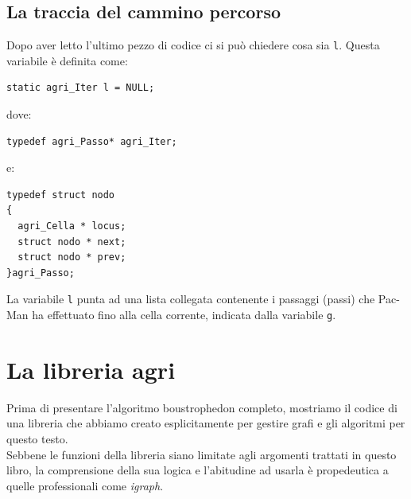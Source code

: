 \documentclass[8pt]{book}
\begin{document}
\subsection{La traccia del cammino percorso}

Dopo aver letto l'ultimo pezzo di codice ci si può chiedere cosa sia \texttt{l}. Questa variabile è definita come:

  \begin{spacing}{0.9}
    \begin{small}
      \begin{tcolorbox}
\begin{verbatim}
static agri_Iter l = NULL;
\end{verbatim}
    \end{tcolorbox}
  \end{small}
\end{spacing}

dove:

  \begin{spacing}{0.9}
    \begin{small}
      \begin{tcolorbox}
\begin{verbatim}
typedef agri_Passo* agri_Iter; 
\end{verbatim}
    \end{tcolorbox}
  \end{small}
\end{spacing}

e:

  \begin{spacing}{0.9}
    \begin{small}
      \begin{tcolorbox}
\begin{verbatim}
typedef struct nodo
{
  agri_Cella * locus;
  struct nodo * next;
  struct nodo * prev;
}agri_Passo;  
\end{verbatim}
    \end{tcolorbox}
  \end{small}
\end{spacing}


La variabile \texttt{l} punta ad una lista collegata contenente i passaggi (passi) che Pac-Man ha effettuato fino alla cella corrente, indicata dalla variabile \texttt{g}.


\section{La libreria agri}
Prima di presentare l'algoritmo boustrophedon completo, mostriamo il codice di una libreria che abbiamo creato esplicitamente per gestire grafi e gli algoritmi per questo testo.\\
Sebbene le funzioni della libreria siano limitate agli argomenti trattati in questo libro, la comprensione della sua logica e l'abitudine ad usarla è propedeutica a quelle professionali come \emph{igraph}.
\end{document}
